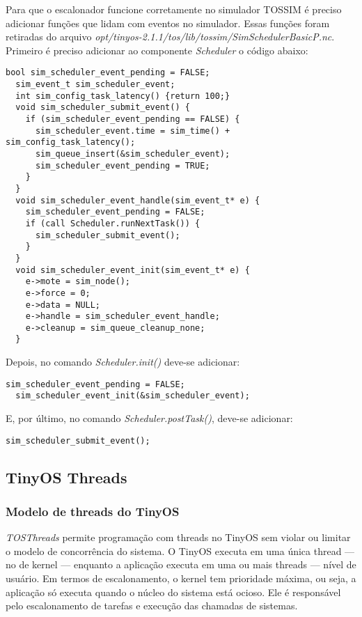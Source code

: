 \documentclass[a4paper,onecolumn, 10pt]{article}
\begin{document}
Para que o escalonador funcione corretamente no simulador TOSSIM é preciso adicionar funções que lidam com eventos no
simulador. Essas funções foram retiradas do arquivo
\textit{opt/tinyos-2.1.1/tos/lib/tossim/SimSchedulerBasicP.nc}.
Primeiro é preciso adicionar ao componente \textit{Scheduler} o código abaixo:
\begin{lstlisting}[frame=single]
  bool sim_scheduler_event_pending = FALSE;
  sim_event_t sim_scheduler_event;
  int sim_config_task_latency() {return 100;}
  void sim_scheduler_submit_event() {
    if (sim_scheduler_event_pending == FALSE) {
      sim_scheduler_event.time = sim_time() + sim_config_task_latency();
      sim_queue_insert(&sim_scheduler_event);
      sim_scheduler_event_pending = TRUE;
    }
  }
  void sim_scheduler_event_handle(sim_event_t* e) {
    sim_scheduler_event_pending = FALSE;
    if (call Scheduler.runNextTask()) {
      sim_scheduler_submit_event();
    }
  }
  void sim_scheduler_event_init(sim_event_t* e) {
    e->mote = sim_node();
    e->force = 0;
    e->data = NULL;
    e->handle = sim_scheduler_event_handle;
    e->cleanup = sim_queue_cleanup_none;
  }
\end{lstlisting}

Depois, no comando \textit{Scheduler.init()} deve-se adicionar:
\begin{lstlisting}[frame=single]
  sim_scheduler_event_pending = FALSE;
  sim_scheduler_event_init(&sim_scheduler_event);
\end{lstlisting}
E, por último, no comando \textit{Scheduler.postTask()}, deve-se adicionar:
\begin{lstlisting}[frame=single]
  sim_scheduler_submit_event();
\end{lstlisting}

\subsection{TinyOS Threads}
\subsubsection{Modelo de threads do TinyOS}

\textit{TOSThreads} permite programação com threads no TinyOS sem violar ou limitar o modelo de concorrência do
sistema. O TinyOS executa em uma única thread --- no de kernel --- enquanto a aplicação executa 
em uma ou mais threads --- nível de usuário.
Em termos de escalonamento, o kernel tem prioridade máxima, ou seja, a aplicação só executa quando o núcleo do sistema
está ocioso. Ele é responsável pelo escalonamento de tarefas e execução das chamadas de sistemas. 
\end{document}
